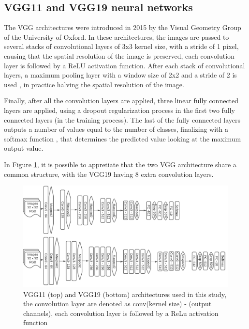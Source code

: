 \documentclass[10pt,twocolumn,letterpaper]{article}
\begin{document}
\subsection{VGG11 and VGG19 neural networks}

The VGG architectures were introduced in 2015 by the Visual Geometry Group of the University of Oxford. In these architectures, the images are passed to several stacks of convolutional layers of 3x3 kernel size,  with a stride of 1 pixel, causing that the spatial resolution of the image is preserved, each convolution layer is followed by a ReLU activation function. After each stack of convolutional layers, a maximum pooling layer with a window size of 2x2 and a stride of 2 is used \cite{Simonyan2015}, in practice halving the spatial resolution of the image.

Finally, after all the convolution layers are applied, three linear fully connected layers are applied, using a dropout regularization process in the first two fully connected layers (in the training process). The last of the fully connected layers outputs a number of values equal to the number of classes, finalizing with a softmax function \cite{Simonyan2015}, that determines the predicted value looking at the maximum output value.

In Figure \ref{fig:vgg}, it is possible to appretiate that the two VGG architecture share a common structure, with the VGG19 having 8 extra convolution layers.

\begin{figure}[h]
	\begin{center}
		\includegraphics[width=1.0\linewidth]{VGG.pdf}
	
		\caption{VGG11 (top) and VGG19 (bottom) architectures used in this study, the convolution layer are denoted as conv(kernel size) - (output channels), each convolution layer is followed by a ReLu activation function \cite{Simonyan2015}}
		\label{fig:vgg}
	\end{center}
\end{figure}
\end{document}
